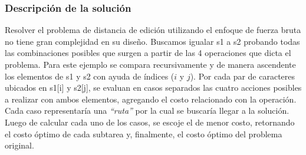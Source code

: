 
\subsubsection{Descripción de la solución}
Resolver el problema de distancia de edición utilizando el enfoque de fuerza bruta no tiene gran complejidad en su diseño.
Buscamos igualar s1 a s2 probando todas las combinaciones posibles que surgen a partir de las 4 operaciones que dicta el problema.
Para este ejemplo se compara recursivamente y de manera ascendente los elementos de s1 y s2 con ayuda de índices ($i$ y $j$).
Por cada par de caracteres ubicados en s1[i] y s2[j], se evaluan en casos separados las cuatro acciones posibles a realizar
con ambos elementos, agregando el costo relacionado con la operación. Cada caso representaría una \textit{``ruta''} por la cual se buscaría llegar a la solución.
Luego de calcular cada uno de los casos, se escoje el de menor costo, retornando el costo óptimo de cada subtarea y, finalmente, el costo óptimo del problema original.

